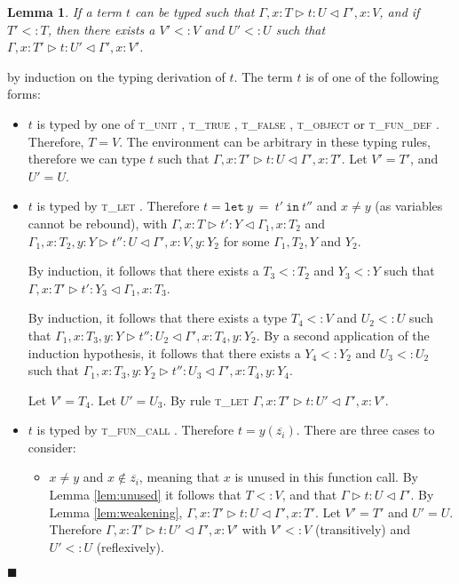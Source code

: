\documentclass[preprint]{sigplanconf}
\newtheorem{lem}{Lemma}
\newcommand{\lemref}[1]{Lemma \ref{#1}}
\newcommand{\tunit}{\textsc{t\_unit} }
\newcommand{\ttrue}{\textsc{t\_true} }
\newcommand{\tfalse}{\textsc{t\_false} }
\newcommand{\tobj}{\textsc{t\_object} }
\newcommand{\tfundef}{\textsc{t\_fun\_def} }
\newcommand{\tlet}{\textsc{t\_let} }
\newcommand{\tfunc}{\textsc{t\_fun\_call} }
\newcommand{\typerule}[4]{#1 \triangleright #2 : #3 \triangleleft #4}
\newcommand{\lett}[3]{\mathtt{let}\:#1\:\mathtt{=}\:#2\:\mathtt{in}\:#3}
\newcommand{\qed}{$\blacksquare$}
\newenvironment{proof}{\vspace{1ex}\noindent{\bf Proof}\hspace{0.5em}}
  {\hfill\qed\vspace{1ex}}
\begin{document}
\begin{lem}
\label{lem:upgrade}
If a term $t$ can be typed such that 
$\typerule{\Gamma, x : T}{t}{U}{\Gamma', x : V}$, and if
$T' <: T$, then there exists a $V' <: V$
and $U' <: U$
such that $\typerule{\Gamma, x : T'}{t}{U'}{\Gamma', x : V'}$.
\end{lem}
\begin{proof}
by induction on the typing derivation of $t$.
The term $t$ is of one of the following forms:

\begin{itemize}
\item $t$ is typed by one of \tunit, \ttrue, \tfalse, \tobj or \tfundef.
Therefore, $T = V$.
The environment can be arbitrary in these typing rules,
therefore we can type $t$ such that 
$\typerule{\Gamma, x : T'}{t}{U}{\Gamma', x : T'}$.
Let $V' = T'$, and $U' = U$.

\item $t$ is typed by \tlet. Therefore $t = \lett{y}{t'}{t''}$ and
$x \neq y$ (as variables cannot be rebound), with
$\typerule{\Gamma, x : T}{t'}{Y}{\Gamma_1, x : T_2}$ and
$\typerule{\Gamma_1, x : T_2, y : Y}{t''}{U}{\Gamma', x : V, y : Y_2}$
for some $\Gamma_1, T_2, Y$ and $Y_2$.

By induction, it follows that there exists a $T_3 <: T_2$ 
and $Y_3 <: Y$
such that
$\typerule{\Gamma, x : T'}{t'}{Y_3}{\Gamma_1, x : T_3}$.

By induction, it follows that there exists a type $T_4 <: V$
and $U_2 <: U$
such that
$\typerule{\Gamma_1, x : T_3, y : Y}{t''}{U_2}{\Gamma', x : T_4, y : Y_2}$.
By a second application of the induction hypothesis, it follows that there
exists a $Y_4 <: Y_2$
and $U_3 <: U_2$ such that
$\typerule{\Gamma_1, x : T_3, y : Y_2}{t''}{U_3}{\Gamma', x : T_4, y : Y_4}$.

Let $V' = T_4$. Let $U' = U_3$. By rule \tlet
$\typerule{\Gamma, x : T'}{t}{U'}{\Gamma', x : V'}$.


\item $t$ is typed by \tfunc. Therefore $t = y ( \overline{z_i} )$.
There are three cases to consider:

\begin{itemize}
	\item $x \neq y$ and $x \notin \overline{z_i}$, meaning that
	$x$ is unused in this function call. By \lemref{lem:unused}
	it follows that $T <: V$, and that
	$\typerule{\Gamma}{t}{U}{\Gamma'}$.
	By \lemref{lem:weakening},
	$\typerule{\Gamma, x : T'}{t}{U}{\Gamma', x : T'}$.
	Let $V' = T'$ and $U' = U$.
	Therefore
	$\typerule{\Gamma, x : T'}{t}{U'}{\Gamma', x : V'}$
	with $V' <: V$ (transitively) and $U' <: U$ (reflexively).


\end{itemize}
\end{itemize}
\end{proof}
\end{document}
